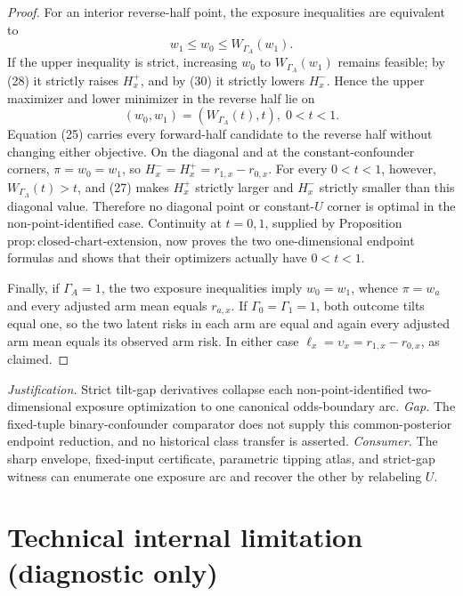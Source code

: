 \documentclass{article}
\begin{document}
\begin{proof}
For an interior reverse-half point, the exposure inequalities are equivalent to
\[
 w_1\leq w_0\leq W_{\Gamma_A}(w_1).
 \tag{31}
\]
If the upper inequality is strict, increasing \(w_0\) to \(W_{\Gamma_A}(w_1)\) remains feasible; by (28) it strictly raises \(H_x^+\), and by (30) it strictly lowers \(H_x^-\).  Hence the upper maximizer and lower minimizer in the reverse half lie on
\[
 (w_0,w_1)=(W_{\Gamma_A}(t),t),\; 0<t<1.
 \tag{32}
\]
Equation (25) carries every forward-half candidate to the reverse half without changing either objective.  On the diagonal and at the constant-confounder corners, \(\pi=w_0=w_1\), so \(H_x^-=H_x^+=r_{1,x}-r_{0,x}\).  For every \(0<t<1\), however, \(W_{\Gamma_A}(t)>t\), and (27) makes \(H_x^+\) strictly larger and \(H_x^-\) strictly smaller than this diagonal value.  Therefore no diagonal point or constant-\(U\) corner is optimal in the non-point-identified case.  Continuity at \(t=0,1\), supplied by Proposition \(\mathrm{prop{:}closed\text{-}chart\text{-}extension}\), now proves the two one-dimensional endpoint formulas and shows that their optimizers actually have \(0<t<1\).

Finally, if \(\Gamma_A=1\), the two exposure inequalities imply \(w_0=w_1\), whence \(\pi=w_a\) and every adjusted arm mean equals \(r_{a,x}\).  If \(\Gamma_0=\Gamma_1=1\), both outcome tilts equal one, so the two latent risks in each arm are equal and again every adjusted arm mean equals its observed arm risk.  In either case \(\ell_x=\upsilon_x=r_{1,x}-r_{0,x}\), as claimed.
\end{proof}
\par\smallskip\noindent \textit{Justification.} Strict tilt-gap derivatives collapse each non-point-identified two-dimensional exposure optimization to one canonical odds-boundary arc. \textit{Gap.} The fixed-tuple binary-confounder comparator does not supply this common-posterior endpoint reduction, and no historical class transfer is asserted. \textit{Consumer.} The sharp envelope, fixed-input certificate, parametric tipping atlas, and strict-gap witness can enumerate one exposure arc and recover the other by relabeling \(U\).

\section*{Technical internal limitation (diagnostic only)}
\end{document}

